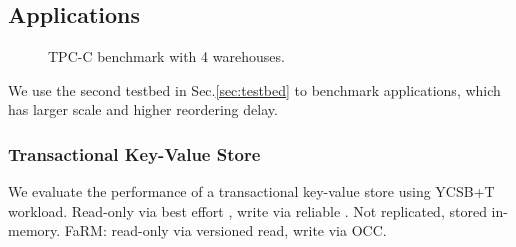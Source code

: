\subsection{Applications}
\label{sec:application}


\begin{figure}[t]
\centering
	\hspace{0.02\textwidth}
    \hspace{0.02\textwidth}
\vspace{-10pt}
\caption{TPC-C benchmark with 4 warehouses.}
\label{fig:tpc-c}
\vspace{-10pt}
\end{figure}


We use the second testbed in Sec.\ref{sec:testbed} to benchmark applications, which has larger scale and higher reordering delay.

\subsubsection{Transactional Key-Value Store}
\label{subsec:eval-kvs}


We evaluate the performance of a transactional key-value store using YCSB+T~\cite{dey2014ycsbt} workload.
Read-only via best effort \sys{}, write via reliable \sys{}.
Not replicated, stored in-memory.
FaRM: read-only via versioned read, write via OCC.

